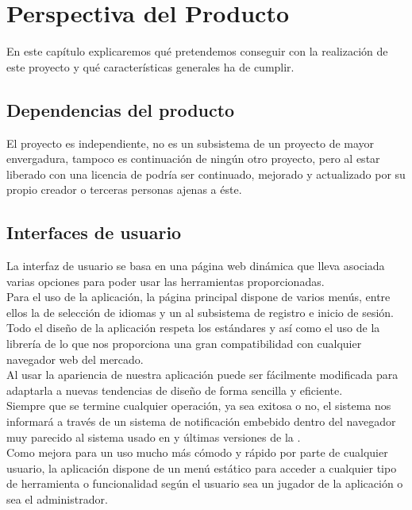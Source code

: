 \section{Perspectiva del Producto}
En este capítulo explicaremos qué pretendemos conseguir con la realización de
este proyecto y qué características generales ha de cumplir.

\subsection{Dependencias del producto}
El proyecto es independiente, no es un subsistema de un proyecto de mayor
envergadura, tampoco es continuación de ningún otro proyecto, pero al estar
liberado con una licencia de  podría ser continuado,
mejorado y actualizado por su propio creador o terceras personas ajenas a éste.

\subsection{Interfaces de usuario}
La interfaz de usuario se basa en una página web dinámica que lleva asociada
varias opciones para poder usar las herramientas
proporcionadas.\\

Para el uso de la aplicación, la página principal dispone de varios menús, entre
ellos la de selección de idiomas y un  al
subsistema de registro e inicio de sesión.\\

Todo el diseño de la aplicación respeta los estándares  y
 así como el uso de la librería de 
lo que nos proporciona una gran
compatibilidad con cualquier navegador web del mercado.\\

Al usar  la apariencia de nuestra aplicación puede
ser fácilmente modificada para adaptarla a nuevas
tendencias de diseño de forma sencilla y eficiente.\\

Siempre que se termine cualquier operación, ya sea exitosa o no, el sistema nos
informará a través de un sistema de notificación embebido dentro del navegador
muy parecido al sistema usado en  y últimas versiones de la .\\

Como mejora para un uso mucho más cómodo y rápido por parte de cualquier
usuario, la aplicación dispone de un menú estático para acceder a cualquier tipo
de herramienta o funcionalidad según el usuario sea un jugador de la aplicación
o sea el administrador.

